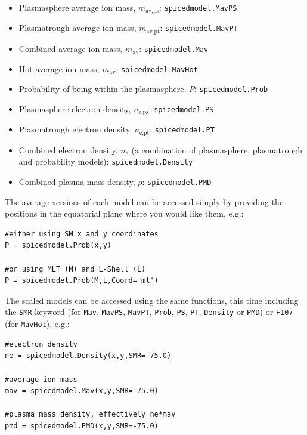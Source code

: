 				\begin{itemize}
					\item Plasmasphere average ion mass, $m_{\text{av,ps}}$: \texttt{spicedmodel.MavPS}
					\item Plasmatrough average ion mass, $m_{\text{av,pt}}$: \texttt{spicedmodel.MavPT}
					\item Combined average ion mass, $m_{\text{av}}$: \texttt{spicedmodel.Mav}
					\item Hot average ion mass, $m_{\text{av}}$: \texttt{spicedmodel.MavHot}
					\item Probability of being within the plasmasphere, $P$: \texttt{spicedmodel.Prob}
					\item Plasmasphere electron density, $n_{\text{e,ps}}$: \texttt{spicedmodel.PS}
					\item Plasmatrough electron density, $n_{\text{e,pt}}$: \texttt{spicedmodel.PT}
					\item Combined electron density, $n_{\text{e}}$ (a combination of plasmasphere, plasmatrough and probability models): \texttt{spicedmodel.Density}
					\item Combined plasma mass density, $\rho$: \texttt{spicedmodel.PMD}
				\end{itemize}

				The average versions of each model can be accessed simply by providing the positions in the equatorial plane where you would like them, e.g.:

\begin{verbatim}
#either using SM x and y coordinates
P = spicedmodel.Prob(x,y)

#or using MLT (M) and L-Shell (L)
P = spicedmodel.Prob(M,L,Coord='ml')
\end{verbatim}

				The scaled models can be accessed using the same functions, this time including the \texttt{SMR} keyword (for \texttt{Mav}, \texttt{MavPS}, \texttt{MavPT}, \texttt{Prob}, \texttt{PS}, \texttt{PT}, \texttt{Density} or \texttt{PMD}) or \texttt{F107} (for \texttt{MavHot}), e.g.:

\begin{verbatim}
#electron density
ne = spicedmodel.Density(x,y,SMR=-75.0)

#average ion mass
mav = spicedmodel.Mav(x,y,SMR=-75.0)

#plasma mass density, effectively ne*mav
pmd = spicedmodel.PMD(x,y,SMR=-75.0)
\end{verbatim}

